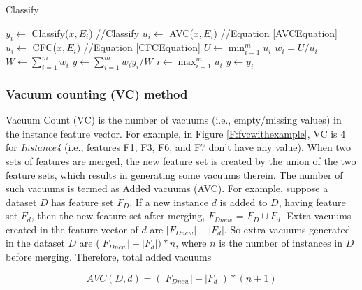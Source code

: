 
\begin{algorithm} 
	\caption{Classify} 
	\label{a:Classify}
	{%
		\begin{algorithmic}[1]  
			\STATE $y_i \leftarrow $ Classify($x, E_i$) //Classify
			\STATE $u_i \leftarrow $ AVC($x, E_i$) //Equation 
			\ref{AVCEquation}
			\ENDIF		
			\STATE $u_i \leftarrow $ CFC($x, E_i$) //Equation \ref{CFCEquation}
			\ENDIF		
			\ENDFOR       
			\STATE $U \leftarrow \min_{i=1}^m{u_i}$ 
			\STATE $w_i = U/u_i$       		
			\ENDFOR
			\STATE $W \leftarrow \sum_{i=1}^m{w_i}$ 
			\STATE $y \leftarrow \sum_{i=1}^m{w_i y_i}/W $  			
			\ELSE
			\STATE $i \leftarrow \max_{i=1}^m{u_i}$
			\STATE $y \leftarrow y_i $  
			\ENDIF       
			 
		\end{algorithmic}  
	} 
\end{algorithm} 

\subsubsection{Vacuum counting (VC) method} \label{sec:VCMethod}
Vacuum Count (VC) is the number of vacuums (i.e., empty/missing values) in the instance feature vector. For example, in Figure \ref{F:fvcwithexample}, VC is 4 for \textit{Instance4} (i.e., features F1, F3, F6, and F7 don’t have any value). When two sets of features are merged, the new feature set is created by the union of the two feature sets, which results in generating some vacuums therein. The number of such vacuums is termed as Added vacuums (AVC). For example, suppose a dataset $D$ has feature set $F_D$. If a new instance $d$ is added to $D$, having feature set $F_d$, then the new feature set after merging, $F_{Dnew}$ = $F_D \cup F_d$. Extra vacuums created in the feature vector of $d$ are $|F_{Dnew}|- |F_d|$. So extra vacuums generated in the dataset $D$ are ($|F_{Dnew}| - |F_d|) * n $, where $n$ is the number of instances in $D$ before merging. Therefore, total added vacuums

\begin{equation} \label{AVCEquation}
AVC(D, d) = (|F_{Dnew}| - |F_d|) * (n + 1)
\end{equation}


